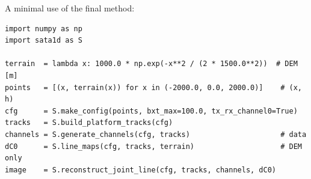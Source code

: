 A minimal use of the final method:
{\small
\begin{verbatim}
import numpy as np
import sata1d as S

terrain  = lambda x: 1000.0 * np.exp(-x**2 / (2 * 1500.0**2))  # DEM [m]
points   = [(x, terrain(x)) for x in (-2000.0, 0.0, 2000.0)]    # (x, h)
cfg      = S.make_config(points, bxt_max=100.0, tx_rx_channel0=True)
tracks   = S.build_platform_tracks(cfg)
channels = S.generate_channels(cfg, tracks)                     # data
dC0      = S.line_maps(cfg, tracks, terrain)                    # DEM only
image    = S.reconstruct_joint_line(cfg, tracks, channels, dC0)
\end{verbatim}
}
